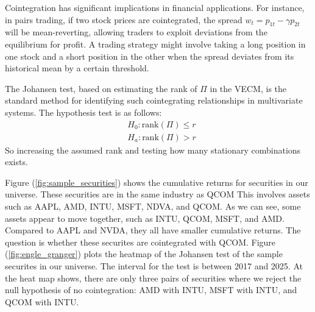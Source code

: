 Cointegration has significant implications in financial applications. For instance, in pairs trading, if two stock prices are cointegrated, the spread \( w_t = p_{1t} - \gamma p_{2t} \) will be mean-reverting, allowing traders to exploit deviations from the equilibrium for profit. A trading strategy might involve taking a long position in one stock and a short position in the other when the spread deviates from its historical mean by a certain threshold. 

The Johansen test, based on estimating the rank of \( \Pi \) in the VECM, is the standard method for identifying such cointegrating relationships in multivariate systems. The hypothesis test is as follows:
\begin{equation}
	\begin{aligned}
		&H_0:\text{rank}(\Pi)\leq r\\
		&H_a:\text{rank}(\Pi)>r
	\end{aligned}
\end{equation}
So increasing the assumed rank and testing how many stationary combinations exists. 


Figure (\ref{fig:sample_securities}) shows the cumulative returns for securities in our universe. These securities are in the same industry as QCOM This involves assets such as AAPL, AMD, INTU, MSFT, NDVA, and QCOM. As we can see, some assets appear to move together, such as INTU, QCOM, MSFT, and AMD. Compared to AAPL and NVDA, they all have smaller cumulative returns. The question is whether these securites are cointegrated with QCOM. Figure (\ref{fig:engle_granger}) plots the heatmap of the Johansen test of the sample securites in our universe. The interval for the test is between 2017 and 2025. At the heat map shows, there are only three pairs of securities where we reject the null hypothesis of no cointegration: AMD with INTU, MSFT with INTU, and QCOM with INTU.

